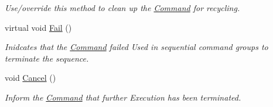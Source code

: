 \begin{DoxyCompactItemize}
\begin{DoxyCompactList}\small\item\em Use/override this method to clean up the \hyperlink{classstrange_1_1extensions_1_1command_1_1impl_1_1_command}{Command} for recycling. \end{DoxyCompactList}\item 
\hypertarget{classstrange_1_1extensions_1_1command_1_1impl_1_1_command_a09ff0edefacd05382f9f978bab8195ff}{virtual void \hyperlink{classstrange_1_1extensions_1_1command_1_1impl_1_1_command_a09ff0edefacd05382f9f978bab8195ff}{Fail} ()}\label{classstrange_1_1extensions_1_1command_1_1impl_1_1_command_a09ff0edefacd05382f9f978bab8195ff}

\begin{DoxyCompactList}\small\item\em Inidcates that the \hyperlink{classstrange_1_1extensions_1_1command_1_1impl_1_1_command}{Command} failed Used in sequential command groups to terminate the sequence. \end{DoxyCompactList}\item 
\hypertarget{classstrange_1_1extensions_1_1command_1_1impl_1_1_command_a500dacf34f897fec9ad6930a24ec3332}{void \hyperlink{classstrange_1_1extensions_1_1command_1_1impl_1_1_command_a500dacf34f897fec9ad6930a24ec3332}{Cancel} ()}\label{classstrange_1_1extensions_1_1command_1_1impl_1_1_command_a500dacf34f897fec9ad6930a24ec3332}

\begin{DoxyCompactList}\small\item\em Inform the \hyperlink{classstrange_1_1extensions_1_1command_1_1impl_1_1_command}{Command} that further Execution has been terminated. \end{DoxyCompactList}\end{DoxyCompactItemize}
